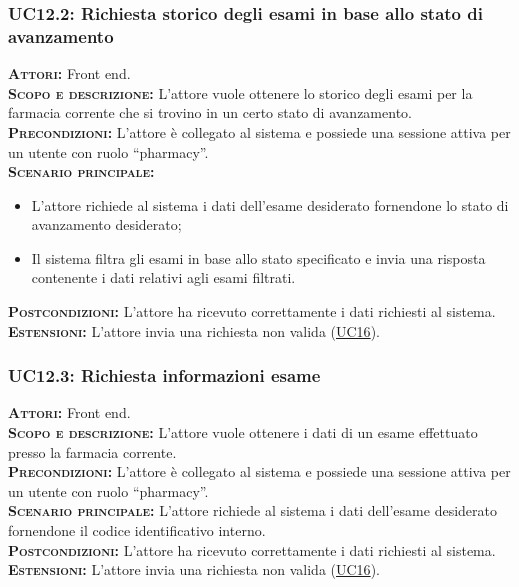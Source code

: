 \subsubsection{UC12.2: Richiesta storico degli esami in base allo stato di avanzamento}
\label{sec:UC122}
\textsc{\textbf{Attori:}} Front end.\\
\textsc{\textbf{Scopo e descrizione:}} L'attore vuole ottenere lo storico degli esami per la farmacia corrente che si trovino in un certo stato di avanzamento.\\
\textsc{\textsc{\textbf{Precondizioni:}}} L'attore è collegato al sistema e possiede una sessione attiva per un utente con ruolo ``pharmacy''.\\
\textsc{\textsc{\textbf{Scenario principale:}}} 
\begin{itemize}
    \item L'attore richiede al sistema i dati dell'esame desiderato fornendone lo stato di avanzamento desiderato;
    \item Il sistema filtra gli esami in base allo stato specificato e invia una risposta contenente i dati relativi agli esami filtrati.
\end{itemize} 
\textsc{\textbf{Postcondizioni:}} L'attore ha ricevuto correttamente i dati richiesti al sistema.\\
\textsc{\textbf{Estensioni:}} L'attore invia una richiesta non valida (\hyperref[sec:UC16]{UC16}).

\subsubsection{UC12.3: Richiesta informazioni esame}
\label{sec:UC123}
\textsc{\textbf{Attori:}} Front end.\\
\textsc{\textbf{Scopo e descrizione:}} L'attore vuole ottenere i dati di un esame  effettuato presso la farmacia corrente.\\
\textsc{\textsc{\textbf{Precondizioni:}}} L'attore è collegato al sistema e possiede una sessione attiva per un utente con ruolo ``pharmacy''.\\
\textsc{\textbf{Scenario principale:}} L'attore richiede al sistema i dati dell'esame desiderato fornendone il codice identificativo interno.\\
\textsc{\textbf{Postcondizioni:}} L'attore ha ricevuto correttamente i dati richiesti al sistema.\\
\textsc{\textbf{Estensioni:}} L'attore invia una richiesta non valida (\hyperref[sec:UC16]{UC16}).

